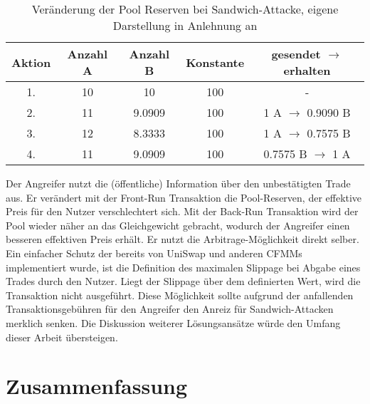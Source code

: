 \documentclass[12pt,a4paper,titlepage,oneside,english]{article}
\begin{document}
\begin{table}[h!]
  \center
  \begin{tabular}{|c|cccc|}       
    \hline
    Aktion & Anzahl A & Anzahl B & Konstante & gesendet $\rightarrow$ erhalten \\ \hline
    1. & 10 & 10 & 100 & - \\    
    2. & 11 & 9.0909  & 100  & 1 A $\rightarrow$ 0.9090 B \\ 
    3. & 12 & 8.3333 & 100 & 1 A $\rightarrow$ 0.7575 B \\
    4. & 11 & 9.0909 & 100 & 0.7575 B $\rightarrow$ 1 A \\
    \hline
  \end{tabular}
  \caption{Veränderung der Pool Reserven bei Sandwich-Attacke, eigene Darstellung in Anlehnung an \citet{Buterin2018} }
  \label{tbl:Sandwich}
\end{table}
Der Angreifer nutzt die (öffentliche) Information über den unbestätigten Trade aus. Er verändert mit der Front-Run Transaktion die Pool-Reserven, der effektive Preis für den Nutzer verschlechtert sich. Mit der Back-Run Transaktion wird der Pool wieder näher an das Gleichgewicht gebracht, wodurch der Angreifer einen besseren effektiven Preis erhält. Er nutzt die Arbitrage-Möglichkeit direkt selber.
Ein einfacher Schutz der bereits von UniSwap und anderen CFMMs implementiert wurde, ist die Definition des maximalen Slippage bei Abgabe eines Trades durch den Nutzer.  Liegt der Slippage über dem definierten Wert, wird die Transaktion nicht ausgeführt. Diese Möglichkeit sollte aufgrund der anfallenden Transaktionsgebühren für den Angreifer den Anreiz für Sandwich-Attacken merklich senken. Die Diskussion weiterer Lösungsansätze würde den Umfang dieser Arbeit übersteigen. \\ 

\section{Zusammenfassung}%

\end{document}
